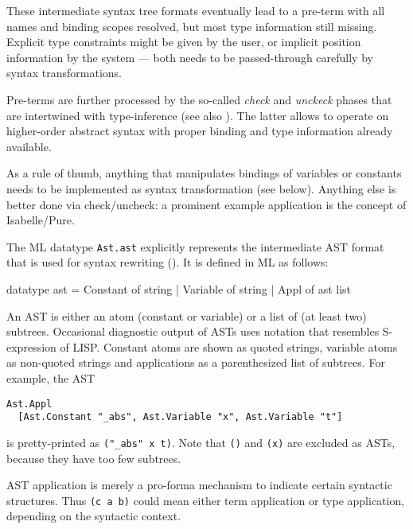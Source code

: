 \begin{isabellebody}
\begin{isamarkuptext}
  These intermediate syntax tree formats eventually lead to a pre-term
  with all names and binding scopes resolved, but most type
  information still missing.  Explicit type constraints might be given by
  the user, or implicit position information by the system --- both
  needs to be passed-through carefully by syntax transformations.

  Pre-terms are further processed by the so-called \emph{check} and
  \emph{unckeck} phases that are intertwined with type-inference (see
  also \cite{isabelle-implementation}).  The latter allows to operate
  on higher-order abstract syntax with proper binding and type
  information already available.

  As a rule of thumb, anything that manipulates bindings of variables
  or constants needs to be implemented as syntax transformation (see
  below).  Anything else is better done via check/uncheck: a prominent
  example application is the \hyperlink{command.abbreviation}{\mbox{}} concept of
  Isabelle/Pure.%
\end{isamarkuptext}%
\isamarkuptrue%
%
\isamarkuptrue%
%
\begin{isamarkuptext}%
The ML datatype \verb|Ast.ast| explicitly represents the
  intermediate AST format that is used for syntax rewriting
  ().  It is defined in ML as follows:
  \begin{ttbox}
  datatype ast =
    Constant of string |
    Variable of string |
    Appl of ast list
  \end{ttbox}

  An AST is either an atom (constant or variable) or a list of (at
  least two) subtrees.  Occasional diagnostic output of ASTs uses
  notation that resembles S-expression of LISP.  Constant atoms are
  shown as quoted strings, variable atoms as non-quoted strings and
  applications as a parenthesized list of subtrees.  For example, the
  AST
  \begin{verbatim}
Ast.Appl
  [Ast.Constant "_abs", Ast.Variable "x", Ast.Variable "t"]
\end{verbatim}
  is pretty-printed as \verb|("_abs" x t)|.  Note that
  \verb|()| and \verb|(x)| are excluded as ASTs, because
  they have too few subtrees.

  \medskip AST application is merely a pro-forma mechanism to indicate
  certain syntactic structures.  Thus \verb|(c a b)| could mean
  either term application or type application, depending on the
  syntactic context.


\end{isamarkuptext}
\end{isabellebody}
